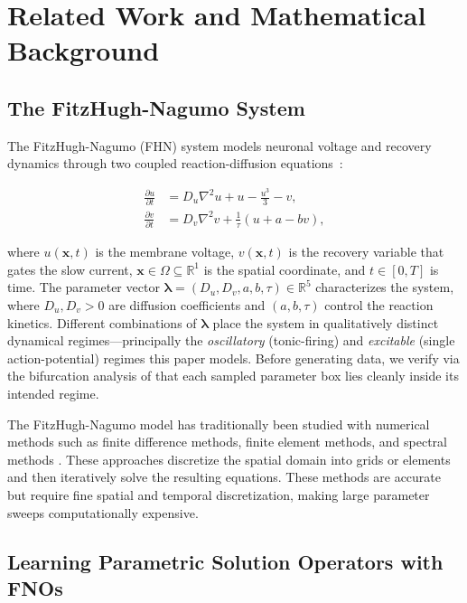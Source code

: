 \documentclass[runningheads]{llncs}
\begin{document}
\section{Related Work and Mathematical Background}

\subsection{The FitzHugh-Nagumo System}

The FitzHugh-Nagumo (FHN) system models neuronal voltage and recovery dynamics through two coupled reaction-diffusion equations~\cite{FitzHugh1961,Nagumo1962}:

\begin{align}
\frac{\partial u}{\partial t} &= D_u \nabla^2 u + u - \frac{u^3}{3} - v, \label{eq:fhn_u} \\
\frac{\partial v}{\partial t} &= D_v \nabla^2 v + \frac{1}{\tau}(u + a - b v), \label{eq:fhn_v}
\end{align}

\noindent where $u(\bm{x},t)$ is the membrane voltage, $v(\bm{x},t)$ is the recovery variable that gates the slow current, $\bm{x} \in \Omega \subseteq \mathbb{R}^1$ is the spatial coordinate, and $t \in [0,T]$ is time. The parameter vector $\bm{\lambda} = (D_u, D_v, a, b, \tau) \in \mathbb{R}^5$ characterizes the system, where $D_u, D_v > 0$ are diffusion coefficients and $(a, b, \tau)$ control the reaction kinetics. Different combinations of $\bm{\lambda}$ place the system in qualitatively distinct dynamical regimes---principally the \emph{oscillatory} (tonic-firing) and \emph{excitable} (single action-potential) regimes this paper models. Before generating data, we verify via the bifurcation analysis of  that each sampled parameter box lies cleanly inside its intended regime.

The FitzHugh-Nagumo model has traditionally been studied with numerical methods such as finite difference methods, finite element methods, and spectral methods \cite{Quarteroni2000,LeVeque2007}. These approaches discretize the spatial domain into grids or elements and then iteratively solve the resulting equations. These methods are accurate but require fine spatial and temporal discretization, making large parameter sweeps computationally expensive.

\subsection{Learning Parametric Solution Operators with FNOs}
\end{document}
